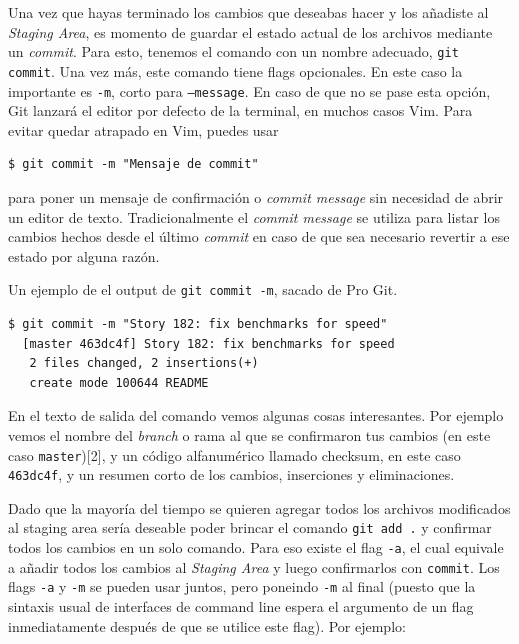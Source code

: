 \documentclass[spanish, 12pt, a4paper]{article}
\begin{document}
Una vez que hayas terminado los cambios que deseabas hacer y los
añadiste al \emph{Staging Area}, es momento de guardar el estado actual
de los archivos mediante un \emph{commit}. Para esto, tenemos el comando
con un nombre adecuado, \passthrough{\lstinline!git commit!}. Una vez
más, este comando tiene flags opcionales. En este caso la importante es
\passthrough{\lstinline!-m!}, corto para
\passthrough{\lstinline!–message!}. En caso de que no se pase esta
opción, Git lanzará el editor por defecto de la terminal, en muchos
casos Vim. Para evitar quedar atrapado en Vim, puedes usar

\begin{lstlisting}
$ git commit -m "Mensaje de commit"
\end{lstlisting}

para poner un mensaje de confirmación o \emph{commit message} sin
necesidad de abrir un editor de texto. Tradicionalmente el \emph{commit
message} se utiliza para listar los cambios hechos desde el último
\emph{commit} en caso de que sea necesario revertir a ese estado por
alguna razón.

Un ejemplo de el output de \passthrough{\lstinline!git commit -m!},
sacado de Pro Git.

\begin{lstlisting}
$ git commit -m "Story 182: fix benchmarks for speed"
  [master 463dc4f] Story 182: fix benchmarks for speed
   2 files changed, 2 insertions(+)
   create mode 100644 README
\end{lstlisting}

En el texto de salida del comando vemos algunas cosas interesantes. Por
ejemplo vemos el nombre del \emph{branch} o rama al que se confirmaron
tus cambios (en este caso \passthrough{\lstinline!master!}){[}2{]}, y un
código alfanumérico llamado checksum, en este caso
\passthrough{\lstinline!463dc4f!}, y un resumen corto de los cambios,
inserciones y eliminaciones.

Dado que la mayoría del tiempo se quieren agregar todos los archivos
modificados al staging area sería deseable poder brincar el comando
\passthrough{\lstinline!git add .!} y confirmar todos los cambios en un
solo comando. Para eso existe el flag \passthrough{\lstinline!-a!}, el
cual equivale a añadir todos los cambios al \emph{Staging Area} y luego
confirmarlos con \passthrough{\lstinline!commit!}. Los flags
\passthrough{\lstinline!-a!} y \passthrough{\lstinline!-m!} se pueden
usar juntos, pero poneindo \passthrough{\lstinline!-m!} al final (puesto
que la sintaxis usual de interfaces de command line espera el argumento
de un flag inmediatamente después de que se utilice este flag). Por
ejemplo:
\end{document}
